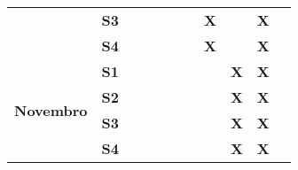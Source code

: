 \begin{table}[]
\begin{tabular}{|clllclllllllllll|}
\\ \cline{5-15} 
\multicolumn{4}{|c|}{}                                   & \multicolumn{3}{c|}{\textbf{S3}}                      & \multicolumn{1}{l|}{\textbf{}}  & \multicolumn{1}{l|}{\textbf{}}  & \multicolumn{1}{l|}{\textbf{}}  & \multicolumn{1}{l|}{\textbf{}}  & \multicolumn{1}{l|}{\textbf{}}  & \multicolumn{1}{l|}{\textbf{X}}  & \multicolumn{1}{l|}{\textbf{}} & \multicolumn{1}{l|}{\textbf{X}} 
\\ \cline{5-15} 
\multicolumn{4}{|c|}{}                                   & \multicolumn{3}{c|}{\textbf{S4}}                      & \multicolumn{1}{l|}{\textbf{}}  & \multicolumn{1}{l|}{\textbf{}}  & \multicolumn{1}{l|}{\textbf{}}  & \multicolumn{1}{l|}{\textbf{}}  & \multicolumn{1}{l|}{\textbf{}}  & \multicolumn{1}{l|}{\textbf{X}}  & \multicolumn{1}{l|}{\textbf{}} & \multicolumn{1}{l|}{\textbf{X}}
\\ \hline
\multicolumn{4}{|c|}{\multirow{4}{*}{\textbf{Novembro}}} & \multicolumn{3}{c|}{\textbf{S1}}                      & \multicolumn{1}{l|}{\textbf{}}  & \multicolumn{1}{l|}{\textbf{}}  & \multicolumn{1}{l|}{\textbf{}}  & \multicolumn{1}{l|}{\textbf{}}  & \multicolumn{1}{l|}{\textbf{}}  & \multicolumn{1}{l|}{\textbf{}}  & \multicolumn{1}{l|}{\textbf{X}}  & \multicolumn{1}{l|}{\textbf{X}} \\ \cline{5-15} 
\multicolumn{4}{|c|}{}                                   & \multicolumn{3}{c|}{\textbf{S2}}                      & \multicolumn{1}{l|}{\textbf{}}  & \multicolumn{1}{l|}{\textbf{}}  & \multicolumn{1}{l|}{\textbf{}}  & \multicolumn{1}{l|}{\textbf{}}  & \multicolumn{1}{l|}{\textbf{}}  & \multicolumn{1}{l|}{\textbf{}}  & \multicolumn{1}{l|}{\textbf{X}}  & \multicolumn{1}{l|}{\textbf{X}} \\ \cline{5-15} 
\multicolumn{4}{|c|}{}                                   & \multicolumn{3}{c|}{\textbf{S3}}                      & \multicolumn{1}{l|}{\textbf{}}  & \multicolumn{1}{l|}{\textbf{}}  & \multicolumn{1}{l|}{\textbf{}}  & \multicolumn{1}{l|}{\textbf{}}  & \multicolumn{1}{l|}{\textbf{}}  & \multicolumn{1}{l|}{\textbf{}}  & \multicolumn{1}{l|}{\textbf{X}}  & \multicolumn{1}{l|}{\textbf{X}} \\ \cline{5-15} 
\multicolumn{4}{|c|}{}                                   & \multicolumn{3}{c|}{\textbf{S4}}                      & \multicolumn{1}{l|}{\textbf{}}  & \multicolumn{1}{l|}{\textbf{}}  & \multicolumn{1}{l|}{\textbf{}}  & \multicolumn{1}{l|}{\textbf{}}  & \multicolumn{1}{l|}{\textbf{}}  & \multicolumn{1}{l|}{\textbf{}}  & \multicolumn{1}{l|}{\textbf{X}}  & \multicolumn{1}{l|}{\textbf{X}} \\ \hline

\end{tabular}
\end{table}
